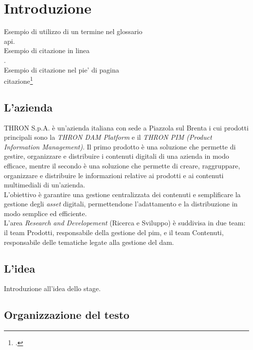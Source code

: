 \chapter{Introduzione}
\label{cap:introduzione}


\noindent Esempio di utilizzo di un termine nel glossario \\
\gls{api}. \\

\noindent Esempio di citazione in linea \\
\cite{site:agile-manifesto}. \\

\noindent Esempio di citazione nel pie' di pagina \\
citazione\footcite{womak:lean-thinking} \\

\section{L'azienda}

THRON S.p.A. è un'azienda italiana con sede a Piazzola sul Brenta i cui prodotti
principali sono la \textit{THRON DAM Platform} e il \textit{THRON PIM (Product
    Information Management)}. Il primo prodotto è una soluzione che permette di
gestire, organizzare e distribuire i contenuti digitali di una azienda in modo
efficace, mentre il secondo è una soluzione che permette di creare, raggruppare,
organizzare e distribuire le informazioni relative ai prodotti e ai contenuti
multimediali di un'azienda.\\
L'obiettivo è garantire una gestione centralizzata dei contenuti e semplificare
la gestione degli \textit{asset} digitali, permettendone l'adattamento e la
distribuzione in modo semplice ed efficiente.\\
L'area \textit{Research and Developement} (Ricerca e Sviluppo) è suddivisa in due team: il team Prodotti, responsabile
della gestione del \gls{pim}, e il team Contenuti, responsabile
delle tematiche legate alla gestione del \gls{dam}.\\
\section{L'idea}

Introduzione all'idea dello stage.

\section{Organizzazione del testo}

